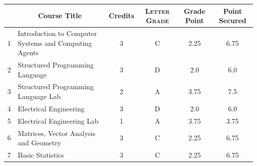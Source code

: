 \documentclass[11pt]{article}
\newcommand*{\numtwo}[1]{\pgfmathprintnumber[
                    fixed, precision=2, fixed zerofill=true]{#1}}
\begin{document}
                \begin{center}
                    \renewcommand{\arraystretch}{1.08}
                    
                \begin{tabular}{|c|l|c|>{\scshape}c|c|c|}
                \hline  \rule[-1ex]{0pt}{3.5ex} {\centering{\bf Course Code}} &  \multicolumn{1}{c|}{\textbf{Course Title}}  & {\bf Credits} & {\bf Letter Grade} & {\bf Grade Point} & {\bf Point Secured}  \\ 
                \hline   1 &  Introduction to Computer Systems and Computing Agents		 & 3 & C & 2.25 & 6.75 \\ %
                \hline   2 &  Structured Programming Language		 & 3 & D & 2.0 & 6.0 \\ %
                \hline   3 &  Structured Programming Language Lab		 & 2 & A & 3.75 & 7.5 \\ %
                \hline   4 &  Electrical Engineering		 & 3 & D & 2.0 & 6.0 \\ %
                \hline   5 &  Electrical Engineering Lab		 & 1 & A & 3.75 & 3.75 \\ %
                \hline   6 &  Matrices, Vector Analysis and Geometry		 & 3 & C & 2.25 & 6.75 \\ %
                \hline   7 &  Basic Statistics		 & 3 & C & 2.25 & 6.75 \\ %

\hline                %
                \end{tabular}
                \end{center}
                \renewcommand{\arraystretch}{1.03}
\end{document}
